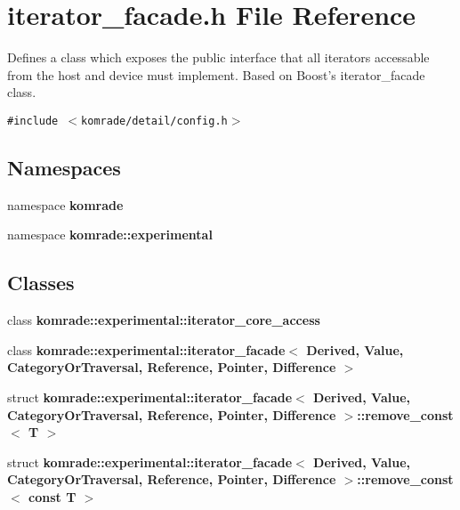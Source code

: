 \section{iterator\_\-facade.h File Reference}
\label{iterator__facade_8h}
Defines a class which exposes the public interface that all iterators accessable from the host and device must implement. Based on Boost's iterator\_\-facade class. 

{\tt \#include $<$komrade/detail/config.h$>$}\par
\subsection*{Namespaces}
\begin{CompactItemize}
\item 
namespace {\bf komrade}
\item 
namespace {\bf komrade::experimental}
\end{CompactItemize}
\subsection*{Classes}
\begin{CompactItemize}
\item 
class \textbf{komrade::experimental::iterator\_\-core\_\-access}
\item 
class \textbf{komrade::experimental::iterator\_\-facade$<$ Derived, Value, CategoryOrTraversal, Reference, Pointer, Difference $>$}
\item 
struct \textbf{komrade::experimental::iterator\_\-facade$<$ Derived, Value, CategoryOrTraversal, Reference, Pointer, Difference $>$::remove\_\-const$<$ T $>$}
\item 
struct \textbf{komrade::experimental::iterator\_\-facade$<$ Derived, Value, CategoryOrTraversal, Reference, Pointer, Difference $>$::remove\_\-const$<$ const T $>$}
\end{CompactItemize}
